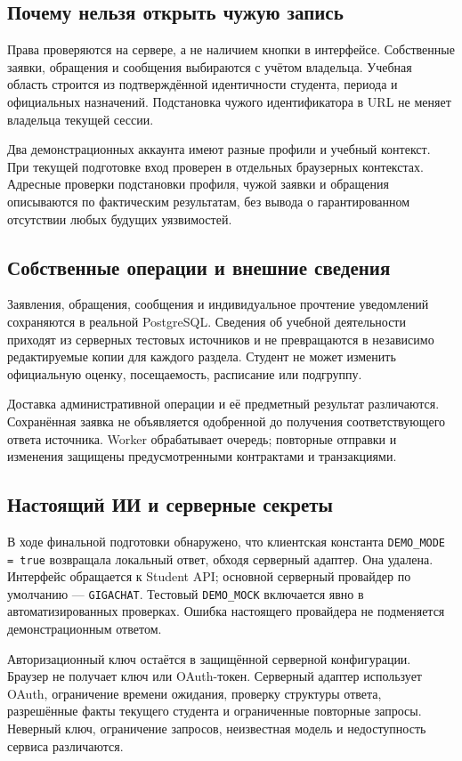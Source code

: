 \documentclass[11pt,a4paper]{article}
\begin{document}
\subsection{Почему нельзя открыть чужую запись}
Права проверяются на сервере, а не наличием кнопки в интерфейсе. Собственные заявки, обращения и сообщения выбираются с учётом владельца. Учебная область строится из подтверждённой идентичности студента, периода и официальных назначений. Подстановка чужого идентификатора в URL не меняет владельца текущей сессии.

Два демонстрационных аккаунта имеют разные профили и учебный контекст. При текущей подготовке вход проверен в отдельных браузерных контекстах. Адресные проверки подстановки профиля, чужой заявки и обращения описываются по фактическим результатам, без вывода о гарантированном отсутствии любых будущих уязвимостей.

\subsection{Собственные операции и внешние сведения}
Заявления, обращения, сообщения и индивидуальное прочтение уведомлений сохраняются в реальной PostgreSQL. Сведения об учебной деятельности приходят из серверных тестовых источников и не превращаются в независимо редактируемые копии для каждого раздела. Студент не может изменить официальную оценку, посещаемость, расписание или подгруппу.

Доставка административной операции и её предметный результат различаются. Сохранённая заявка не объявляется одобренной до получения соответствующего ответа источника. Worker обрабатывает очередь; повторные отправки и изменения защищены предусмотренными контрактами и транзакциями.

\subsection{Настоящий ИИ и серверные секреты}
В ходе финальной подготовки обнаружено, что клиентская константа \texttt{DEMO\_MODE = true} возвращала локальный ответ, обходя серверный адаптер. Она удалена. Интерфейс обращается к Student API; основной серверный провайдер по умолчанию — \texttt{GIGACHAT}. Тестовый \texttt{DEMO\_MOCK} включается явно в автоматизированных проверках. Ошибка настоящего провайдера не подменяется демонстрационным ответом.

Авторизационный ключ остаётся в защищённой серверной конфигурации. Браузер не получает ключ или OAuth-токен. Серверный адаптер использует OAuth, ограничение времени ожидания, проверку структуры ответа, разрешённые факты текущего студента и ограниченные повторные запросы. Неверный ключ, ограничение запросов, неизвестная модель и недоступность сервиса различаются.
\end{document}

